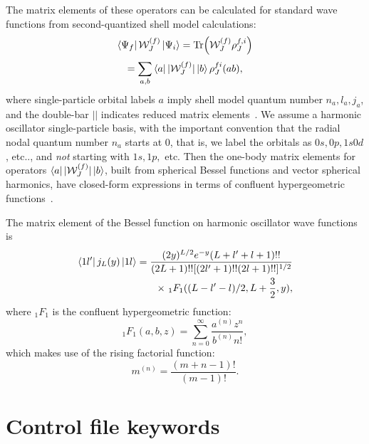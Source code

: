 \documentclass[
14pt, %
a4paper, %
oneside, %
headinclude,footinclude, %
BCOR5mm, %
]{scrartcl}
\begin{document}
The matrix elements of these operators can be calculated for standard wave functions from second-quantized shell model calculations:
\begin{equation*}
    \bra{\Psi_f} \mathcal{W}^{(f)}_J \ket{\Psi_i} = \Tr(\mathcal{W}^{(f)}_J \rho^{f,i}_J )
\end{equation*}
\begin{equation}
 = \sum_{a,b}
     \bra{a} |\mathcal{W}^{(f)}_J| \ket{b}
     \rho^{fi}_J(ab),
\end{equation}
where single-particle orbital labels $a$ imply shell model quantum number $n_a, l_a, j_a$,
and the double-bar $||$ indicates reduced matrix elements~\cite{edmonds1996angular}.
We assume a harmonic oscillator single-particle basis, with the important convention that the
radial nodal quantum number $n_a$ starts at 0, that is, we label the orbitals as $0s, 0p, 1s0d$, etc..,
and \textit{not} starting with $1s, 1p,$ etc.
Then the one-body matrix elements for operators $ \bra{a} |\mathcal{W}^{(f)}_J| \ket{b}$, built from spherical Bessel functions and vector spherical harmonics,  have closed-form expressions in terms of confluent hypergeometric
functions~\cite{DONNELLY1979103}.

The matrix element of the Bessel function on harmonic oscillator wave functions is
\begin{equation}
    \begin{split}
    \bra{1l'}j_L(y)\ket{1l} = 
        \frac{
            (2y)^{L/2}e^{-y}(L+l'+l+1)!!
        }{
            (2L+1)!![(2l'+1)!!(2l+1)!!]^{1/2}
        }\\
        \times\ _1F_1((L-l'-l)/2, L+\frac{3}{2}, y),
    \end{split}
\end{equation}    
where $_1F_1$ is the confluent hypergeometric function:
\begin{equation}
    _1F_1(a,b,z) = \sum_{n=0}^\infty \frac{a^{(n)}z^n}{b^{(n)}n!},
\end{equation}
which makes use of the rising factorial function:
\begin{equation}
    m^{(n)} = \frac{(m+n-1)!}{(m-1)!}.
\end{equation}

\section{Control file keywords}\label{cfk}
\end{document}
